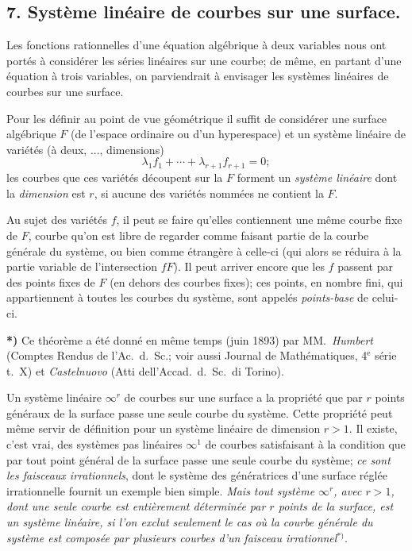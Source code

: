 \documentclass{article}
\begin{document}
\subsection*{7. Système linéaire de courbes sur une surface.}

Les fonctions rationnelles d'une équation algébrique à deux variables nous ont portés à considérer les séries linéaires sur une courbe; de même, en partant d'une équation à trois variables, on parviendrait à envisager les systèmes linéaires de courbes sur une surface.

Pour les définir au point de vue géométrique il suffit de considérer une surface algébrique $F$ (de l'espace ordinaire ou d'un hyperespace) et un système linéaire de variétés (à deux, ..., dimensions)
\[
\lambda_{1}f_{1} + \cdots + \lambda_{r+1}f_{r+1} = 0;
\]
les courbes que ces variétés découpent sur la $F$ forment un \emph{système linéaire} dont la \emph{dimension} est $r$, si aucune des variétés nommées ne contient la $F$.

Au sujet des variétés $f$, il peut se faire qu'elles contiennent une même courbe fixe de $F$, courbe qu'on est libre de regarder comme faisant partie de la courbe générale du système, ou bien comme étrangère à celle-ci (qui alors se réduira à la partie variable de l'intersection $fF$). Il peut arriver encore que les $f$ passent par des points fixes de $F$ (en dehors des courbes fixes); ces points, en nombre fini, qui appartiennent à toutes les courbes du système, sont appelés \emph{points-base} de celui-ci.

\textbf{*)} Ce théorème a été donné en même temps (juin 1893) par MM.\ \emph{Humbert} (Comptes Rendus de l'Ac.\ d.\ Sc.; voir aussi Journal de Mathématiques, 4${}^{\text{e}}$ série t.\ X) et \emph{Castelnuovo} (Atti dell'Accad.\ d.\ Sc.\ di Torino).


Un système linéaire $\infty^{r}$ de courbes sur une surface a la propriété que par $r$ points généraux de la surface passe une seule courbe du système. Cette propriété peut même servir de définition pour un système linéaire de dimension $r > 1$. Il existe, c'est vrai, des systèmes pas linéaires $\infty^{1}$ de courbes satisfaisant à la condition que par tout point général de la surface passe une seule courbe du système; \emph{ce sont les faisceaux irrationnels}, dont le système des génératrices d'une surface réglée irrationnelle fournit un exemple bien simple. \emph{Mais tout système $\infty^{r}$, avec $r > 1$, dont une seule courbe est entièrement déterminée par $r$ points de la surface, est un système linéaire, si l'on exclut seulement le cas où la courbe générale du système est composée par plusieurs courbes d'un faisceau irrationnel}${}^{*)}$.
\end{document}
